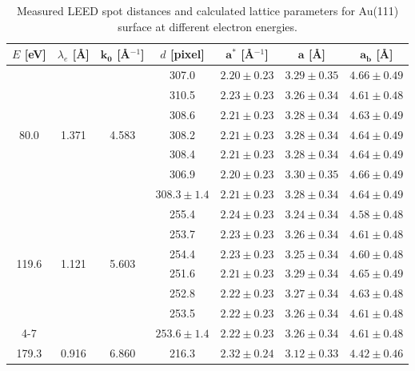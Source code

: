 \documentclass[fontsize=11pt,reqno,a4paper,oneside]{scrartcl}
\begin{document}
\begin{table}[htbp]
    \centering
    \caption{Measured \ac{LEED} spot distances and calculated lattice parameters for Au(111) surface at different electron energies.}
        \begin{tabular}{@{}ccccccc@{}} \toprule
                $E$ [eV] & $\lambda_e$ [\AA] & $\mathbf{k_0}$ [\AA$^{-1}$] & $d$ [pixel] & $\mathbf{a^*}$ [\AA$^{-1}$] & $\mathbf{a}$ [\AA] & $\mathbf{a_{b}}$ [\AA] \\
                \midrule
                \multirow{7}{*}{80.0} & \multirow{7}{*}{1.371} & \multirow{7}{*}{4.583} & 307.0 & $2.20 \pm 0.23$ & $3.29 \pm 0.35$ & $4.66 \pm 0.49$ \\
                & & & 310.5 & $2.23 \pm 0.23$ & $3.26 \pm 0.34$ & $4.61 \pm 0.48$ \\
                & & & 308.6 & $2.21 \pm 0.23$ & $3.28 \pm 0.34$ & $4.63 \pm 0.49$ \\
                & & & 308.2 & $2.21 \pm 0.23$ & $3.28 \pm 0.34$ & $4.64 \pm 0.49$ \\
                & & & 308.4 & $2.21 \pm 0.23$ & $3.28 \pm 0.34$ & $4.64 \pm 0.49$ \\
                & & & 306.9 & $2.20 \pm 0.23$ & $3.30 \pm 0.35$ & $4.66 \pm 0.49$ \\
                \cmidrule{4-7}
                & & & $308.3 \pm 1.4$ & $2.21 \pm 0.23$ & $3.28 \pm 0.34$ & $4.64 \pm 0.49$ \\
                \midrule \midrule
                \multirow{6}{*}{119.6} & \multirow{6}{*}{1.121} & \multirow{6}{*}{5.603} & 255.4 & $2.24 \pm 0.23$ & $3.24 \pm 0.34$ & $4.58 \pm 0.48$ \\
                & & & 253.7 & $2.23 \pm 0.23$ & $3.26 \pm 0.34$ & $4.61 \pm 0.48$ \\
                & & & 254.4 & $2.23 \pm 0.23$ & $3.25 \pm 0.34$ & $4.60 \pm 0.48$ \\
                & & & 251.6 & $2.21 \pm 0.23$ & $3.29 \pm 0.34$ & $4.65 \pm 0.49$ \\
                & & & 252.8 & $2.22 \pm 0.23$ & $3.27 \pm 0.34$ & $4.63 \pm 0.48$ \\
                & & & 253.5 & $2.22 \pm 0.23$ & $3.26 \pm 0.34$ & $4.61 \pm 0.48$ \\
                \cmidrule{4-7}
                & & & $253.6 \pm 1.4$ & $2.22 \pm 0.23$ & $3.26 \pm 0.34$ & $4.61 \pm 0.48$ \\
                \midrule \midrule
                \multirow{7}{*}{179.3} & \multirow{7}{*}{0.916} & \multirow{7}{*}{6.860} & 216.3 & $2.32 \pm 0.24$ & $3.12 \pm 0.33$ & $4.42 \pm 0.46$ \\

\end{tabular}
\end{table}
\end{document}
